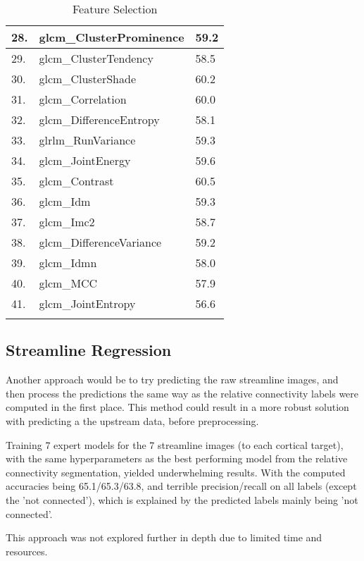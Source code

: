 \begin{longtable}[H]{|l|l|l|}
28. & glcm\_ClusterProminence & 59.2 \\ \hline
29. & glcm\_ClusterTendency & 58.5 \\ \hline
30. & glcm\_ClusterShade & 60.2 \\ \hline
31. & glcm\_Correlation & 60.0 \\ \hline
32. & glcm\_DifferenceEntropy & 58.1 \\ \hline
33. & glrlm\_RunVariance & 59.3 \\ \hline
34. & glcm\_JointEnergy & 59.6 \\ \hline
35. & glcm\_Contrast & 60.5 \\ \hline
36. & glcm\_Idm & 59.3 \\ \hline
37. & glcm\_Imc2 & 58.7 \\ \hline
38. & glcm\_DifferenceVariance & 59.2 \\ \hline
39. & glcm\_Idmn & 58.0 \\ \hline
40. & glcm\_MCC & 57.9 \\ \hline
41. & glcm\_JointEntropy & 56.6 \\ \hline
\caption{Feature Selection}
\end{longtable}

\subsection{Streamline Regression}

Another approach would be to try predicting the raw streamline images, and then process the predictions the same way as the relative connectivity labels were computed in the first place. This method could result in a more robust solution with predicting a the upstream data, before preprocessing.\par

Training 7 expert models for the 7 streamline images (to each cortical target), with the same hyperparameters as the best performing model from the relative connectivity segmentation, yielded underwhelming results. With the computed accuracies being 65.1/65.3/63.8, and terrible precision/recall on all labels (except the 'not connected'), which is explained by the predicted labels mainly being 'not connected'.\par

This approach was not explored further in depth due to limited time and resources.




